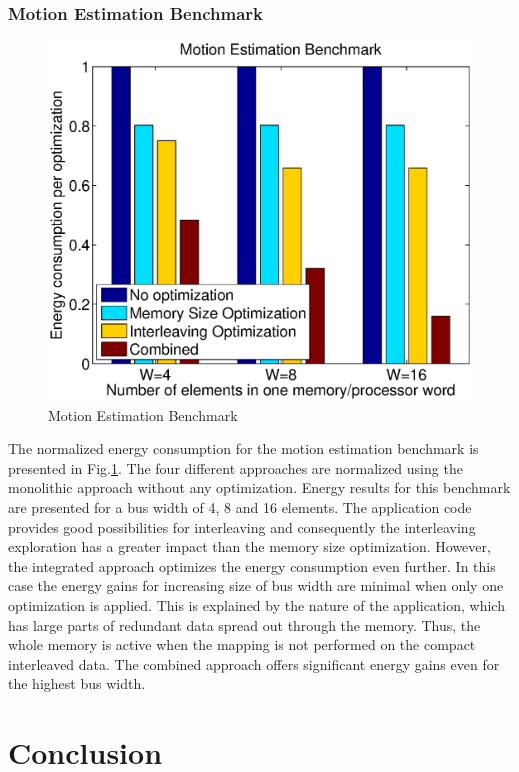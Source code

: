 \documentclass[prodmode,acmtecs]{acmsmall}
\begin{document}
\subsubsection{Motion Estimation Benchmark}

\begin{figure}
\centering
	\includegraphics[scale = 0.5]{Images/mest.eps} 
	\caption{Motion Estimation Benchmark}
	\label{fig:mest}
\end{figure}

The normalized energy consumption for the motion estimation benchmark is presented in Fig.\ref{fig:mest}.
The four different approaches are normalized using the monolithic approach without any optimization.
Energy results for this benchmark are presented for a bus width of 4, 8 and 16 elements.
The application code provides good possibilities for interleaving and consequently the interleaving exploration has a greater impact than the memory size optimization.
However, the integrated approach optimizes the energy consumption even further.
In this case the energy gains for increasing size of bus width are minimal when only one optimization is applied.
This is explained by the nature of the application, which has large parts of redundant data spread out through the memory.
Thus, the whole memory is active when the mapping is not performed on the compact interleaved data.
The combined approach offers significant energy gains even for the highest bus width. 

\section{Conclusion}
\label{sec:conclusion}
\end{document}
